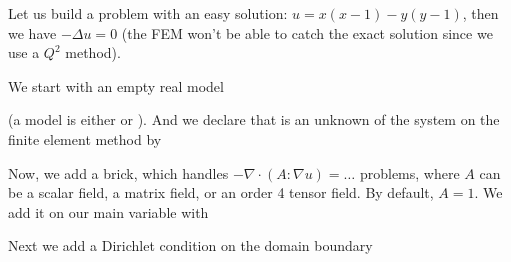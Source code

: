 \documentclass[a4paper,11pt,english]{sphinxmanual}
\begin{document}
Let us build a problem with an easy solution: \(u = x(x-1)-y(y-1)\), then
we have \(-\Delta u = 0\) (the FEM won’t be able to catch the exact
solution since we use a \(Q^2\) method).

We start with an empty real model

\begin{sphinxVerbatim}[commandchars=\\\{\},numbers=left,firstnumber=1,stepnumber=1]

\end{sphinxVerbatim}

(a model is either  or ). And we declare that  is an
unknown of the system on the finite element method  by

\begin{sphinxVerbatim}[commandchars=\\\{\},numbers=left,firstnumber=1,stepnumber=1]

\end{sphinxVerbatim}

Now, we add a  brick, which handles \(-\nabla\cdot(A:\nabla
u) = \ldots\) problems, where \(A\) can be a scalar field, a matrix field, or
an order 4 tensor field. By default, \(A=1\). We add it on our main variable
 with

\begin{sphinxVerbatim}[commandchars=\\\{\},numbers=left,firstnumber=1,stepnumber=1]

\end{sphinxVerbatim}

Next we add a Dirichlet condition on the domain boundary

\begin{sphinxVerbatim}[commandchars=\\\{\},numbers=left,firstnumber=1,stepnumber=1]

  
  
\end{sphinxVerbatim}
\end{document}

